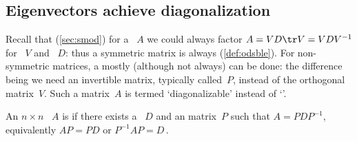 \subsection{Eigenvectors achieve diagonalization}
\label{sec:ditead}


Recall that (\autoref{sec:smod}) for a ~\(A\) we could always factor \(A=VD\tr V=VDV^{-1}\) for ~\(V\) and ~\(D\): thus a symmetric matrix is always  (\autoref{def:odsble}).
For non-symmetric matrices, a  mostly (although not always) can be done:
the difference being we need an invertible matrix, typically called~\(P\), instead of the orthogonal matrix~\(V\).
Such a matrix~\(A\) is termed `diagonalizable' instead of `'.


\begin{definition} \label{def:diagonalise} 
An \(n\times n\) ~\(A\) is  if there exists a ~\(D\) and an  matrix~\(P\) such that \(A=PDP^{-1}\), equivalently \(AP=PD\) or \(P^{-1}AP=D\)\,.
\end{definition}


